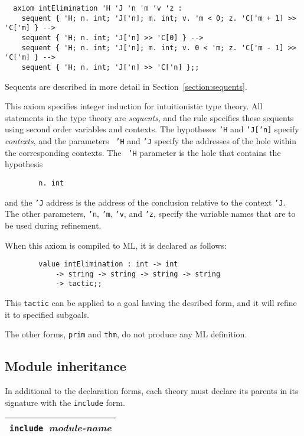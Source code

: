 \documentclass{article}
\newcommand\syntax{\noindent{\bf Syntax}\makebox[1in]{\dotfill}\rule[-1em]{0em}{3em}\par\noindent}
\begin{document}
\begin{verbatim}
  axiom intElimination 'H 'J 'n 'm 'v 'z :
    sequent { 'H; n. int; 'J['n]; m. int; v. 'm < 0; z. 'C['m + 1] >> 'C['m] } -->
    sequent { 'H; n. int; 'J['n] >> 'C[0] } -->
    sequent { 'H; n. int; 'J['n]; m. int; v. 0 < 'm; z. 'C['m - 1] >> 'C['m] } -->
    sequent { 'H; n. int; 'J['n] >> 'C['n] };;
\end{verbatim}

Sequents are described in more detail in Section~\ref{section:sequents}.

This axiom specifies integer induction for intuitionistic type theory.  All statements in the type
theory are {\em sequents}, and the rule specifies these sequents using second order variables and
contexts.  The hypotheses {\tt 'H} and {\tt 'J['n]} specify {\em contexts}, and the parameters {\tt
  'H} and {\tt 'J} specify the addresses of the hole within the corresponding contexts.  The {\tt
  'H} parameter is the hole that contains the hypothesis

\begin{verbatim}
        n. int
\end{verbatim}

and the {\tt 'J} address is the address of the conclusion relative to the context {\tt 'J}.  The
other parameters, {\tt 'n}, {\tt 'm}, {\tt 'v}, and {\tt 'z}, specify the variable names that are to
be used during refinement.

When this axiom is compiled to ML, it is declared as follows:

\begin{verbatim}
        value intElimination : int -> int
            -> string -> string -> string -> string
            -> tactic;;
\end{verbatim}

This {\tt tactic} can be applied to a goal having the desribed form, and it will refine it to
specified subgoals.

The other forms, {\tt prim} and {\tt thm}, do not produce any ML definition.

\subsection{Module inheritance}

In additional to the declaration forms, each theory must declare its parents in its signature with
the {\tt include} form.

\syntax

\begin{center}
  \begin{tabular}{|l|}
    \hline
    \hbox{\tt include}\ {\it module-name}\\
    \hline
  \end{tabular}
\end{center}
\end{document}
